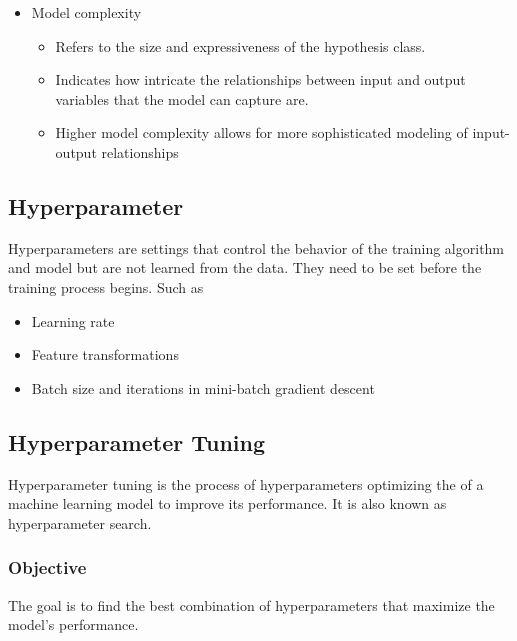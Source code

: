 \documentclass{article}
\begin{document}
\begin{itemize}
\begin{itemize}
\begin{itemize}
        \end{itemize}
        \item Model complexity
        \begin{itemize}
            \item Refers to the size and expressiveness of the hypothesis class.
            \item Indicates how intricate the relationships between input and output variables that the model can capture are.
            \item Higher model complexity allows for more sophisticated modeling of input-output relationships
        \end{itemize}
    \end{itemize}
\end{itemize}

\subsection*{Hyperparameter}
Hyperparameters are settings that control the behavior of the training algorithm and model but are not learned from the data. They need to be set before the training process begins. Such as 
\begin{itemize}
    \item Learning rate
    \item Feature transformations
    \item Batch size and iterations in mini-batch gradient descent
\end{itemize}
\subsection*{Hyperparameter Tuning}
Hyperparameter tuning is the process of hyperparameters optimizing the of a machine learning model to improve its performance. It is also known as hyperparameter search.
\subsubsection*{Objective} 
The goal is to find the best combination of hyperparameters that maximize the model's performance.
\end{document}
